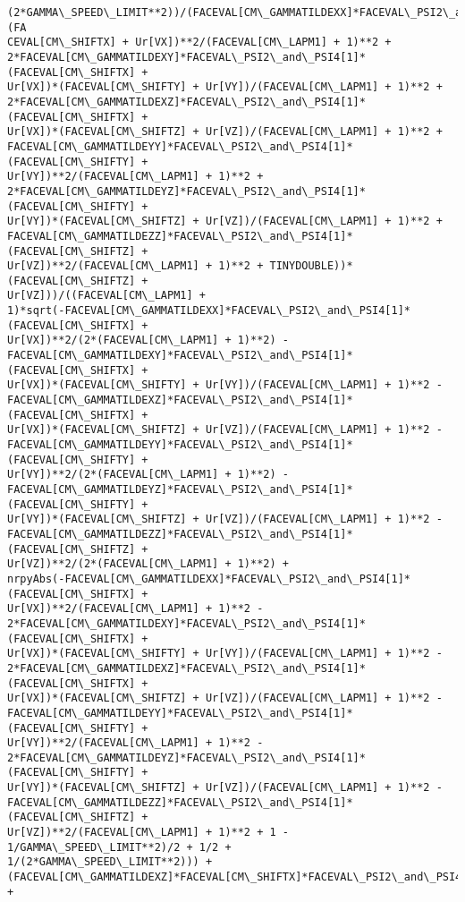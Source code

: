 \documentclass[landscape,letterpaper,10pt,english]{article}
\begin{document}
\begin{Verbatim}[commandchars=\\\{\}]
(2*GAMMA\_SPEED\_LIMIT**2))/(FACEVAL[CM\_GAMMATILDEXX]*FACEVAL\_PSI2\_and\_PSI4[1]*(FA
CEVAL[CM\_SHIFTX] + Ur[VX])**2/(FACEVAL[CM\_LAPM1] + 1)**2 +
2*FACEVAL[CM\_GAMMATILDEXY]*FACEVAL\_PSI2\_and\_PSI4[1]*(FACEVAL[CM\_SHIFTX] +
Ur[VX])*(FACEVAL[CM\_SHIFTY] + Ur[VY])/(FACEVAL[CM\_LAPM1] + 1)**2 +
2*FACEVAL[CM\_GAMMATILDEXZ]*FACEVAL\_PSI2\_and\_PSI4[1]*(FACEVAL[CM\_SHIFTX] +
Ur[VX])*(FACEVAL[CM\_SHIFTZ] + Ur[VZ])/(FACEVAL[CM\_LAPM1] + 1)**2 +
FACEVAL[CM\_GAMMATILDEYY]*FACEVAL\_PSI2\_and\_PSI4[1]*(FACEVAL[CM\_SHIFTY] +
Ur[VY])**2/(FACEVAL[CM\_LAPM1] + 1)**2 +
2*FACEVAL[CM\_GAMMATILDEYZ]*FACEVAL\_PSI2\_and\_PSI4[1]*(FACEVAL[CM\_SHIFTY] +
Ur[VY])*(FACEVAL[CM\_SHIFTZ] + Ur[VZ])/(FACEVAL[CM\_LAPM1] + 1)**2 +
FACEVAL[CM\_GAMMATILDEZZ]*FACEVAL\_PSI2\_and\_PSI4[1]*(FACEVAL[CM\_SHIFTZ] +
Ur[VZ])**2/(FACEVAL[CM\_LAPM1] + 1)**2 + TINYDOUBLE))*(FACEVAL[CM\_SHIFTZ] +
Ur[VZ]))/((FACEVAL[CM\_LAPM1] +
1)*sqrt(-FACEVAL[CM\_GAMMATILDEXX]*FACEVAL\_PSI2\_and\_PSI4[1]*(FACEVAL[CM\_SHIFTX] +
Ur[VX])**2/(2*(FACEVAL[CM\_LAPM1] + 1)**2) -
FACEVAL[CM\_GAMMATILDEXY]*FACEVAL\_PSI2\_and\_PSI4[1]*(FACEVAL[CM\_SHIFTX] +
Ur[VX])*(FACEVAL[CM\_SHIFTY] + Ur[VY])/(FACEVAL[CM\_LAPM1] + 1)**2 -
FACEVAL[CM\_GAMMATILDEXZ]*FACEVAL\_PSI2\_and\_PSI4[1]*(FACEVAL[CM\_SHIFTX] +
Ur[VX])*(FACEVAL[CM\_SHIFTZ] + Ur[VZ])/(FACEVAL[CM\_LAPM1] + 1)**2 -
FACEVAL[CM\_GAMMATILDEYY]*FACEVAL\_PSI2\_and\_PSI4[1]*(FACEVAL[CM\_SHIFTY] +
Ur[VY])**2/(2*(FACEVAL[CM\_LAPM1] + 1)**2) -
FACEVAL[CM\_GAMMATILDEYZ]*FACEVAL\_PSI2\_and\_PSI4[1]*(FACEVAL[CM\_SHIFTY] +
Ur[VY])*(FACEVAL[CM\_SHIFTZ] + Ur[VZ])/(FACEVAL[CM\_LAPM1] + 1)**2 -
FACEVAL[CM\_GAMMATILDEZZ]*FACEVAL\_PSI2\_and\_PSI4[1]*(FACEVAL[CM\_SHIFTZ] +
Ur[VZ])**2/(2*(FACEVAL[CM\_LAPM1] + 1)**2) +
nrpyAbs(-FACEVAL[CM\_GAMMATILDEXX]*FACEVAL\_PSI2\_and\_PSI4[1]*(FACEVAL[CM\_SHIFTX] +
Ur[VX])**2/(FACEVAL[CM\_LAPM1] + 1)**2 -
2*FACEVAL[CM\_GAMMATILDEXY]*FACEVAL\_PSI2\_and\_PSI4[1]*(FACEVAL[CM\_SHIFTX] +
Ur[VX])*(FACEVAL[CM\_SHIFTY] + Ur[VY])/(FACEVAL[CM\_LAPM1] + 1)**2 -
2*FACEVAL[CM\_GAMMATILDEXZ]*FACEVAL\_PSI2\_and\_PSI4[1]*(FACEVAL[CM\_SHIFTX] +
Ur[VX])*(FACEVAL[CM\_SHIFTZ] + Ur[VZ])/(FACEVAL[CM\_LAPM1] + 1)**2 -
FACEVAL[CM\_GAMMATILDEYY]*FACEVAL\_PSI2\_and\_PSI4[1]*(FACEVAL[CM\_SHIFTY] +
Ur[VY])**2/(FACEVAL[CM\_LAPM1] + 1)**2 -
2*FACEVAL[CM\_GAMMATILDEYZ]*FACEVAL\_PSI2\_and\_PSI4[1]*(FACEVAL[CM\_SHIFTY] +
Ur[VY])*(FACEVAL[CM\_SHIFTZ] + Ur[VZ])/(FACEVAL[CM\_LAPM1] + 1)**2 -
FACEVAL[CM\_GAMMATILDEZZ]*FACEVAL\_PSI2\_and\_PSI4[1]*(FACEVAL[CM\_SHIFTZ] +
Ur[VZ])**2/(FACEVAL[CM\_LAPM1] + 1)**2 + 1 - 1/GAMMA\_SPEED\_LIMIT**2)/2 + 1/2 +
1/(2*GAMMA\_SPEED\_LIMIT**2))) +
(FACEVAL[CM\_GAMMATILDEXZ]*FACEVAL[CM\_SHIFTX]*FACEVAL\_PSI2\_and\_PSI4[1] +

\end{Verbatim}
\end{document}
